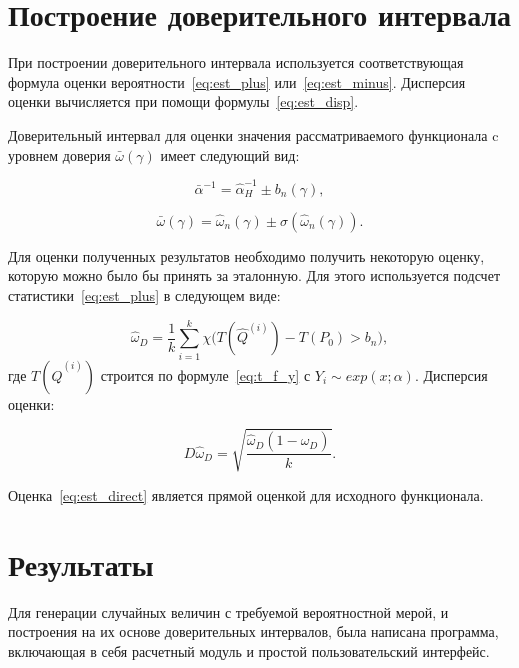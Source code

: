 \documentclass[12pt, specialist, subf, substylefile = spbu.rtx]{disser}
\begin{document}
%
%

\section{Построение доверительного интервала}

При построении доверительного интервала используется соответствующая формула оценки вероятности~\eqref{eq:est_plus} или~\eqref{eq:est_minus}. Дисперсия оценки вычисляется при помощи формулы~\eqref{eq:est_disp}.

Доверительный интервал для оценки значения рассматриваемого функционала c уровнем доверия $\bar{\omega}(\gamma)$ имеет следующий вид: 

\begin{equation}\label{eq:inter_a}
\bar{\alpha}^{-1} = \hat{\alpha}^{-1}_H \pm b_n(\gamma),
\end{equation}

\begin{equation}\label{eq:inter_w}
\bar{\omega}(\gamma) = \hat{\omega}_n(\gamma) \pm \sigma(\hat{\omega}_n(\gamma)).
\end{equation}

Для оценки полученных результатов необходимо получить некоторую оценку, которую можно было бы принять за эталонную. Для этого используется подсчет статистики~\eqref{eq:est_plus} в следующем виде:

\begin{equation}\label{eq:est_direct}
\hat{\omega}_D=\frac{1}{k} \sum\limits_{i=1}^{k}
\chi \big(T(\hat{Q}^{(i)})-T(P_0) > b_n\big),
\end{equation}
где $T(\hat{Q}^{(i)})$ строится по формуле~\eqref{eq:t_f_y} с $Y_i \sim exp(x; \alpha)$. Дисперсия оценки:

$$
D \hat{\omega}_D = \sqrt{\frac{\hat{\omega}_D(1-\hat{\omega}_D)}{k}}.
$$

Оценка~\eqref{eq:est_direct} является прямой оценкой для исходного функционала.


\section{Результаты}

%
%

Для генерации случайных величин с требуемой вероятностной мерой, и построения на их основе доверительных интервалов, была написана программа, включающая в себя расчетный модуль и простой пользовательский интерфейс.
\end{document}
